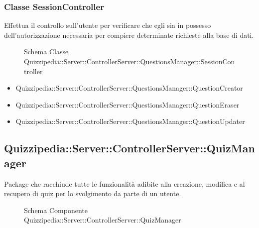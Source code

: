 \subsubsection{Classe SessionController}
Effettua il controllo sull'utente per verificare che egli sia in possesso dell'autorizzazione necessaria per compiere determinate richieste alla base di dati.
\begin{figure}[H]
\centering
\noindent{}
\caption[Schema Classe SessionController]{Schema Classe Quizzipedia::Server::ControllerServer::QuestionsManager::SessionController}
\end{figure}
\begin{itemize}
\item Quizzipedia::Server::ControllerServer::QuestionsManager::QuestionCreator
\item Quizzipedia::Server::ControllerServer::QuestionsManager::QuestionEraser
\item Quizzipedia::Server::ControllerServer::QuestionsManager::QuestionUpdater
\end{itemize}
\subsection{Quizzipedia::Server::ControllerServer::QuizManager}
Package che racchiude tutte le funzionalità adibite alla creazione, modifica e al recupero di quiz per lo svolgimento da parte di un utente.
\begin{figure}[H]
\centering
\noindent{}
\caption[Schema Componente Quizzipedia::Server::ControllerServer::QuizManager]{Schema Componente Quizzipedia::Server::ControllerServer::QuizManager}
\end{figure}
